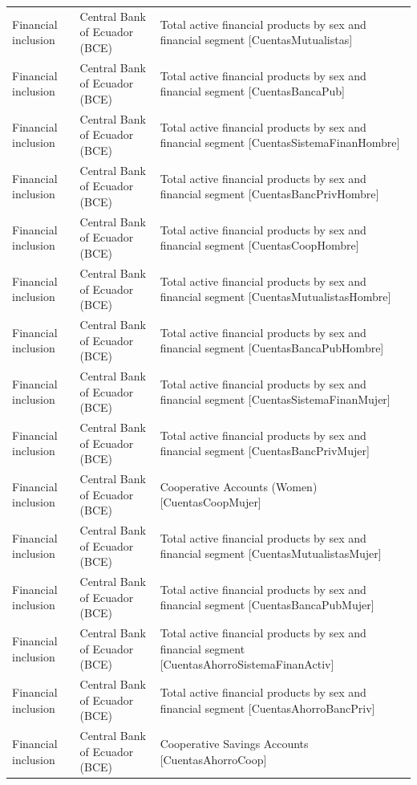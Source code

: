 \begin{landscape}
\begin{longtable}[t]{>{\raggedright\arraybackslash}p{3.4cm}>{\raggedright\arraybackslash}p{5.6cm}>{\raggedright\arraybackslash}p{12.4cm}}
Financial inclusion & Central Bank of Ecuador (BCE) & Total active financial products by sex and financial segment [CuentasMutualistas]\\
Financial inclusion & Central Bank of Ecuador (BCE) & Total active financial products by sex and financial segment [CuentasBancaPub]\\
Financial inclusion & Central Bank of Ecuador (BCE) & Total active financial products by sex and financial segment [CuentasSistemaFinanHom\allowbreak{}bre]\\
Financial inclusion & Central Bank of Ecuador (BCE) & Total active financial products by sex and financial segment [CuentasBancPrivHombre]\\
Financial inclusion & Central Bank of Ecuador (BCE) & Total active financial products by sex and financial segment [CuentasCoopHombre]\\
Financial inclusion & Central Bank of Ecuador (BCE) & Total active financial products by sex and financial segment [CuentasMutualistasHomb\allowbreak{}re]\\
Financial inclusion & Central Bank of Ecuador (BCE) & Total active financial products by sex and financial segment [CuentasBancaPubHombre]\\
Financial inclusion & Central Bank of Ecuador (BCE) & Total active financial products by sex and financial segment [CuentasSistemaFinanMuj\allowbreak{}er]\\
Financial inclusion & Central Bank of Ecuador (BCE) & Total active financial products by sex and financial segment [CuentasBancPrivMujer]\\
Financial inclusion & Central Bank of Ecuador (BCE) & Cooperative Accounts (Women) [CuentasCoopMujer]\\
Financial inclusion & Central Bank of Ecuador (BCE) & Total active financial products by sex and financial segment [CuentasMutualistasMuje\allowbreak{}r]\\
Financial inclusion & Central Bank of Ecuador (BCE) & Total active financial products by sex and financial segment [CuentasBancaPubMujer]\\
Financial inclusion & Central Bank of Ecuador (BCE) & Total active financial products by sex and financial segment [CuentasAhorroSistemaFi\allowbreak{}nanActiv]\\
Financial inclusion & Central Bank of Ecuador (BCE) & Total active financial products by sex and financial segment [CuentasAhorroBancPriv]\\
Financial inclusion & Central Bank of Ecuador (BCE) & Cooperative Savings Accounts [CuentasAhorroCoop]\\

\end{longtable}
\end{landscape}
